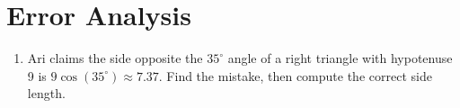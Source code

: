\documentclass{article}
\begin{document}
\section*{Error Analysis}
\begin{enumerate}
  \item Ari claims the side opposite the $35^\circ$ angle of a right triangle
    with hypotenuse 9 is $9\cos(35^\circ) \approx 7.37$. Find the mistake,
    then compute the correct side length.
\end{enumerate}
\end{document}
